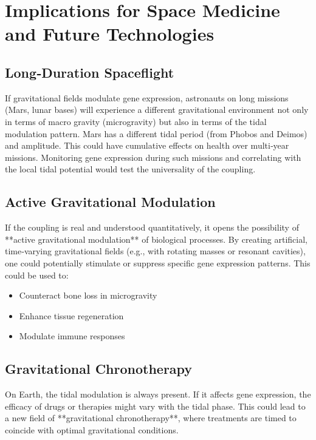 \documentclass[12pt,a4paper]{article}
\theoremstyle{remark}
\begin{document}
	\section{Implications for Space Medicine and Future Technologies}
	\label{sec:applications}
	
	\subsection{Long‑Duration Spaceflight}
	
	If gravitational fields modulate gene expression, astronauts on long missions (Mars, lunar bases) will experience a different gravitational environment not only in terms of macro gravity (microgravity) but also in terms of the tidal modulation pattern. Mars has a different tidal period (from Phobos and Deimos) and amplitude. This could have cumulative effects on health over multi‑year missions. Monitoring gene expression during such missions and correlating with the local tidal potential would test the universality of the coupling.
	
	\subsection{Active Gravitational Modulation}
	
	If the coupling is real and understood quantitatively, it opens the possibility of **active gravitational modulation** of biological processes. By creating artificial, time‑varying gravitational fields (e.g., with rotating masses or resonant cavities), one could potentially stimulate or suppress specific gene expression patterns. This could be used to:
	\begin{itemize}
		\item Counteract bone loss in microgravity
		\item Enhance tissue regeneration
		\item Modulate immune responses
	\end{itemize}
	
	\subsection{Gravitational Chronotherapy}
	
	On Earth, the tidal modulation is always present. If it affects gene expression, the efficacy of drugs or therapies might vary with the tidal phase. This could lead to a new field of **gravitational chronotherapy**, where treatments are timed to coincide with optimal gravitational conditions.
	
\end{document}
